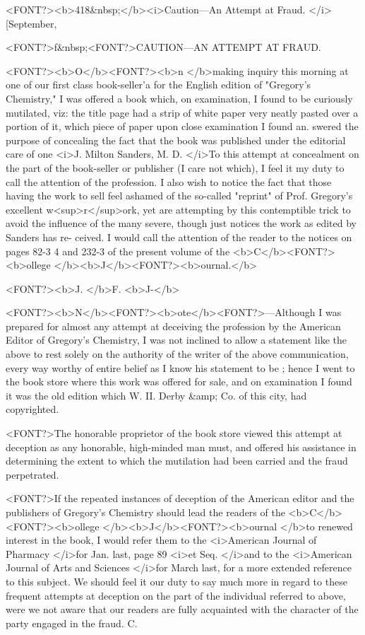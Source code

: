 <FONT?><b>418&nbsp;</b><i>Caution---An Attempt at Fraud. </i>[September,

<FONT?>f&nbsp;<FONT?>CAUTION---AN ATTEMPT AT FRAUD.

<FONT?><b>O</b><FONT?><b>n </b>making inquiry this morning at one of our first class book-seller'a
for the English edition of "Gregory's Chemistry," I was offered a
book which, on examination, I found to be curiously mutilated, viz:
the title page had a strip of white paper very neatly pasted over a
portion of it, which piece of paper upon close examination I found an.
swered the purpose of concealing the fact that the book was published
under the editorial care of one <i>J. Milton Sanders, M. D. </i>To this attempt
at concealment on the part of the book-seller or publisher (I care not
which), I feel it my duty to call the attention of the profession. I also
wish to notice the fact that those having the work to sell feel ashamed
of the so-called "reprint" of Prof. Gregory's excellent w<sup>r</sup>ork, yet are
attempting by this contemptible trick to avoid the influence of the
many severe, though just notices the work as edited by Sanders has re-
ceived. I would call the attention of the reader to the notices on pages
82-3 4 and 232-3 of the present volume of the <b>C</b><FONT?><b>ollege </b><b>J</b><FONT?><b>ournal.</b>

<FONT?><b>J. </b>F. <b>J-</b>

<FONT?><b>N</b><FONT?><b>ote</b><FONT?>---Although I was prepared for almost any attempt at deceiving
the profession by the American Editor of Gregory's Chemistry, I was
not inclined to allow a statement like the above to rest solely on the
authority of the writer of the above communication, every way worthy
of entire belief as I know his statement to be ; hence I went to the
book store where this work was offered for sale, and on examination
I found it was the old edition which W. II. Derby &amp; Co. of this city,
had copyrighted.

<FONT?>The honorable proprietor of the book store viewed this attempt at
deception as any honorable, high-minded man must, and offered his
assistance in determining the extent to which the mutilation had been
carried and the fraud perpetrated.

<FONT?>If the repeated instances of deception of the American editor and
the publishers of Gregory's Chemistry should lead the readers of the
<b>C</b><FONT?><b>ollege </b><b>J</b><FONT?><b>ournal </b>to renewed interest in the book, I would refer them
to the <i>American Journal of Pharmacy </i>for Jan. last, page 89 <i>et Seq.
</i>and to the <i>American Journal of Arts and Sciences </i>for March last, for
a more extended reference to this subject. We should feel it our duty
to say much more in regard to these frequent attempts at deception
on the part of the individual referred to above, were we not aware that
our readers are fully acquainted with the character of the party engaged
in the fraud. C.\endinput
